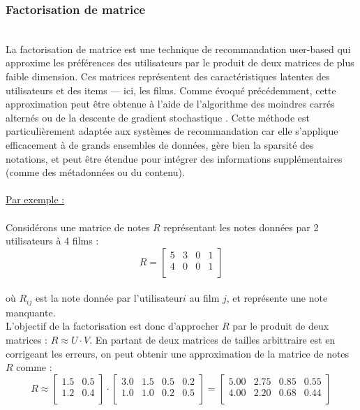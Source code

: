 \documentclass{article}
\begin{document}
\subsubsection{Factorisation de matrice}
$ $\\
La factorisation de matrice \cite{matrix_fac} est une technique de recommandation user-based qui approxime les préférences des utilisateurs par le produit de deux matrices de plus
faible dimension. Ces matrices représentent des caractéristiques latentes des utilisateurs et des items — ici, les films. Comme évoqué précédemment, cette approximation peut être
obtenue à l’aide de l’algorithme des moindres carrés alternés ou de la descente de gradient stochastique .
Cette méthode est particulièrement adaptée aux systèmes de recommandation car elle s’applique efficacement à de grands ensembles de données, gère bien la sparsité des notations, et
peut être étendue pour intégrer des informations supplémentaires (comme des métadonnées ou du contenu).\\
\\
\underline{Par exemple :}\\
\\
Considérons une matrice de notes \( R \) représentant les notes données par 2 utilisateurs à 4 films :\\
\[R =
    \begin{bmatrix}
        5 & 3 & 0 & 1 \\
        4 & 0 & 0 & 1 \\
    \end{bmatrix}
\]
\\
où \( R_{ij} \) est la note donnée par l'utilisateur\( i \) au film \( j \), et  représente une note manquante.\\
L'objectif de la factorisation est donc d'approcher \( R \) par le produit de deux matrices : \(R \approx U \cdot V\).
En partant de deux matrices de tailles arbittraire est en corrigeant les erreurs, on peut obtenir une approximation de la matrice de notes \( R \) comme :\\
\[
    R \approx
    \begin{bmatrix}
        1.5 & 0.5 \\
        1.2 & 0.4 \\
    \end{bmatrix}
    \cdot
    \begin{bmatrix}
        3.0 & 1.5 & 0.5 & 0.2 \\
        1.0 & 1.0 & 0.2 & 0.5 \\
    \end{bmatrix}
    =
    \begin{bmatrix}
        5.00 & 2.75 & 0.85 & 0.55 \\
        4.00 & 2.20 & 0.68 & 0.44 \\
    \end{bmatrix}
\] $ $\\
\end{document}
